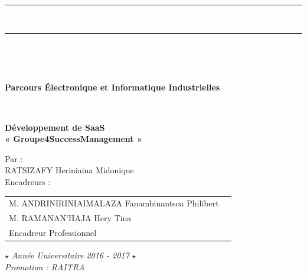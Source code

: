 \documentclass[12pt,a4paper]{report}
\begin{document}
\begin{titlepage}
{\begin{center}
 		\end{center}			
 	}\\
 	\vspace*{-0.7 cm}
 	\centering\parbox{\textwidth}{
 		\begin{center}
 			\color{black}\rule{\textwidth}{0.5pt}\\
 			\vspace*{-0.38 cm}
 			\rule{\textwidth}{1.5pt}\\	
 		\end{center}			
 	}\\
 	\centering\parbox{\textwidth}{
 		\begin{center}		
 			\large\textbf{Parcours Électronique et Informatique Industrielles} \\			
 		\end{center}			
 	}\\
 	\vfill
 	\parbox{\textwidth}{
 		\begin{center}
 			{\Huge \color[rgb]{0,0,1} \bfseries{ Développement de SaaS}} \\	
 			\vspace{0.3 cm}
 			{\Huge \color[rgb]{0,0,1} \bfseries{« Groupe4SuccessManagement »}} \\
 		\end{center}
 	}
 	\vfill
 	
 	\parbox{\textwidth}{
 		\begin{center}
 			\large{Par :}  \\
 			\vspace{0.3 cm}
 			\large{RATSIZAFY Heriniaina Midonique} \\
 			\vspace*{1 cm}
 			\large{Encadreurs :}\\
 			\vspace{0.3 cm}
 			\begin{tabular}{ll}
 				\normalsize M. ANDRINIRINIAIMALAZA Fanambinantsoa Philibert \\
 				\normalsize M. RAMANAN'HAJA Hery Tina \\
 				\normalsize Encadreur Professionnel\\				
 			\end{tabular}
 		\end{center}
 	}
 	
 	\parbox{\textwidth}{
 		\begin{center}
 			$\star$
 			\centering\textit{Année Universitaire 2016 - 2017} $\star$ \\
 			\centering\textit{Promotion : RAITRA}
 		\end{center}
 	}
 \end{titlepage}

\restoregeometry 
\end{document}
